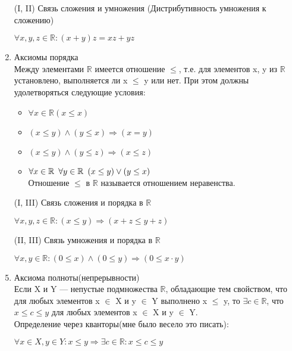 \documentclass[a4paper,14pt]{extreport} %
\begin{document}
\begin{center}
\begin{enumerate}
\begin{enumerate}[label=(\Roman*)]
			\item[(I, II)] Связь сложения и умножения (Дистрибутивность умножения к сложению)
				\begin{center}
					$\forall x,y,z \in \mathbb{R}: (x+y)z=xz+yz$
				\end{center}
			\item Аксиомы порядка\\
			Между элементами $\mathbb{R}$ имеется отношение $\leq$, т.е. для элементов x, y из $\mathbb{R}$ 
			установлено, выполняется ли x $\leq$ y или нет. При этом должны удолетворяться следующие условия:
			\begin{itemize}
				\item $\forall x \in \mathbb{R} (x\leq x)$
				\item $(x\leq y) \land (y\leq x) \Rightarrow (x = y)$
				\item $(x\leq y) \land (y\leq z) \Rightarrow (x \leq z)$
				\item $\forall x \in \mathbb{R} \hspace{5px} \forall y \in \mathbb{R} \hspace{5px} (x\leq y) \lor (y \leq x)$\\
				Отношение $\leq$ в $\mathbb{R}$ называется отношением неравенства.
			\end{itemize}
			
			\item[(I, III)] Связь сложения и порядка в $\mathbb{R}$ 
			\begin{center}
				$\forall x,y,z \in \mathbb{R}: (x\leq y) \Rightarrow (x+z \leq y+z)$
			\end{center}
			
			\item[(II, III)] Связь умножения и порядка в $\mathbb{R}$ 
			\begin{center}
				$\forall x,y \in \mathbb{R}: (0 \leq x) \land (0 \leq y) \Rightarrow (0 \leq x\cdotp y)$
			\end{center}
			
			\item Аксиома полноты(непрерывности)\\
			Если X и Y — непустые подмножества $\mathbb{R}$, обладающие тем свойством, что для любых элементов x $\in$ X и y $\in$ Y выполнено x $\leq$ y, то $\exists c \in \mathbb{R}$, что 
			$x\leq c\leq y$ для любых элементов x $\in$ X и y $\in$ Y.\\
			Определение через кванторы(мне было весело это писать):
			\begin{center}
				$\forall x \in X, y \in Y : x\leq y \Rightarrow \exists c \in \mathbb{R}: x\leq c\leq y $
			\end{center}
		\end{enumerate}
		

\end{enumerate}
\end{center}
\end{document}
